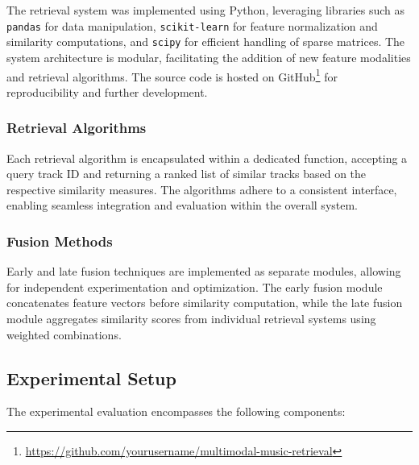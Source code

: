 \documentclass[sigconf]{acmart}
\begin{document}
The retrieval system was implemented using Python, leveraging libraries such as \texttt{pandas} for data manipulation, \texttt{scikit-learn} for feature normalization and similarity computations, and \texttt{scipy} for efficient handling of sparse matrices. The system architecture is modular, facilitating the addition of new feature modalities and retrieval algorithms. The source code is hosted on GitHub\footnote{\url{https://github.com/yourusername/multimodal-music-retrieval}} for reproducibility and further development.

\subsubsection{Retrieval Algorithms}

Each retrieval algorithm is encapsulated within a dedicated function, accepting a query track ID and returning a ranked list of similar tracks based on the respective similarity measures. The algorithms adhere to a consistent interface, enabling seamless integration and evaluation within the overall system.

\subsubsection{Fusion Methods}

Early and late fusion techniques are implemented as separate modules, allowing for independent experimentation and optimization. The early fusion module concatenates feature vectors before similarity computation, while the late fusion module aggregates similarity scores from individual retrieval systems using weighted combinations.

\subsection{Experimental Setup}
\label{subsec:experimental_setup}

The experimental evaluation encompasses the following components:
\end{document}
